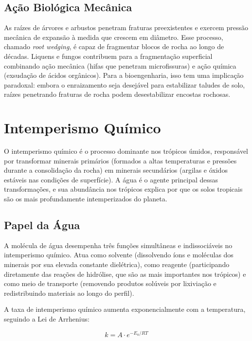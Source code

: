 \documentclass[
  portuguese,
  11pt,
  a4paper,
  open=any]{scrbook}
\begin{document}
\subsection{Ação Biológica
Mecânica}\label{auxe7uxe3o-bioluxf3gica-mecuxe2nica}

As raízes de árvores e arbustos penetram fraturas preexistentes e
exercem pressão mecânica de expansão à medida que crescem em diâmetro.
Esse processo, chamado \emph{root wedging}, é capaz de fragmentar blocos
de rocha ao longo de décadas. Liquens e fungos contribuem para a
fragmentação superficial combinando ação mecânica (hifas que penetram
microfissuras) e ação química (exsudação de ácidos orgânicos). Para a
bioengenharia, isso tem uma implicação paradoxal: embora o enraizamento
seja desejável para estabilizar taludes de solo, raízes penetrando
fraturas de rocha podem desestabilizar encostas rochosas.

\section{Intemperismo Químico}\label{intemperismo-quuxedmico}

O intemperismo químico é o processo dominante nos trópicos úmidos,
responsável por transformar minerais primários (formados a altas
temperaturas e pressões durante a consolidação da rocha) em minerais
secundários (argilas e óxidos estáveis nas condições de superfície). A
água é o agente principal dessas transformações, e sua abundância nos
trópicos explica por que os solos tropicais são os mais profundamente
intemperizados do planeta.

\subsection{Papel da Água}\label{papel-da-uxe1gua}

A molécula de água desempenha três funções simultâneas e indissociáveis
no intemperismo químico. Atua como solvente (dissolvendo íons e
moléculas dos minerais por sua elevada constante dielétrica), como
reagente (participando diretamente das reações de hidrólise, que são as
mais importantes nos trópicos) e como meio de transporte (removendo
produtos solúveis por lixiviação e redistribuindo materiais ao longo do
perfil).

A taxa de intemperismo químico aumenta exponencialmente com a
temperatura, seguindo a Lei de Arrhenius:

\[
k = A \cdot e^{-E_a / RT}
\]
\end{document}
